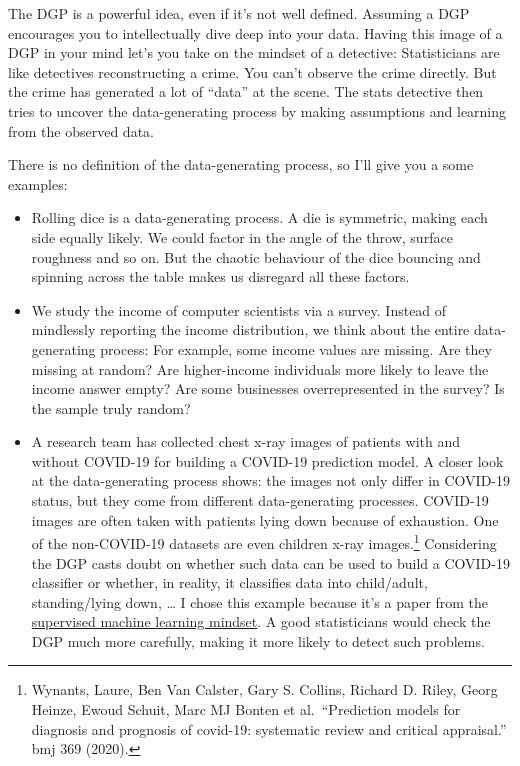 \documentclass[
  10pt,
]{scrbook}
\providecommand{\tightlist}{%
  \setlength{\itemsep}{0pt}\setlength{\parskip}{0pt}}
\begin{document}
The DGP is a powerful idea, even if it's not well defined.
Assuming a DGP encourages you to intellectually dive deep into your data.
Having this image of a DGP in your mind let's you take on the mindset of a detective:
Statisticians are like detectives reconstructing a crime.
You can't observe the crime directly.
But the crime has generated a lot of ``data'' at the scene.
The stats detective then tries to uncover the data-generating process by making assumptions and learning from the observed data.

There is no definition of the data-generating process, so I'll give you a some examples:

\begin{itemize}
\tightlist
\item
  Rolling dice is a data-generating process. A die is symmetric, making each side equally likely. We could factor in the angle of the throw, surface roughness and so on. But the chaotic behaviour of the dice bouncing and spinning across the table makes us disregard all these factors.
\item
  We study the income of computer scientists via a survey. Instead of mindlessly reporting the income distribution, we think about the entire data-generating process: For example, some income values are missing. Are they missing at random? Are higher-income individuals more likely to leave the income answer empty? Are some businesses overrepresented in the survey? Is the sample truly random?
\item
  A research team has collected chest x-ray images of patients with and without COVID-19 for building a COVID-19 prediction model. A closer look at the data-generating process shows: the images not only differ in COVID-19 status, but they come from different data-generating processes. COVID-19 images are often taken with patients lying down because of exhaustion. One of the non-COVID-19 datasets are even children x-ray images.\footnote{Wynants, Laure, Ben Van Calster, Gary S. Collins, Richard D. Riley, Georg Heinze, Ewoud Schuit, Marc MJ Bonten et al.~``Prediction models for diagnosis and prognosis of covid-19: systematic review and critical appraisal.'' bmj 369 (2020).} Considering the DGP casts doubt on whether such data can be used to build a COVID-19 classifier or whether, in reality, it classifies data into child/adult, standing/lying down, \ldots{} I chose this example because it's a paper from the \protect\hyperlink{supervised-ml}{supervised machine learning mindset}. A good statisticians would check the DGP much more carefully, making it more likely to detect such problems.
\end{itemize}
\end{document}

